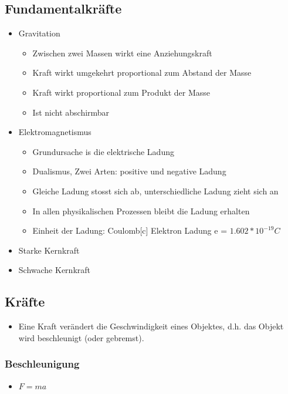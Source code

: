 \documentclass[8pt,a4paper]{scrartcl}
\begin{document}
\begin{multicols*}{3}
    		\subsection{Fundamentalkräfte}
			\begin{itemize}\itemsep0pt				
				\item Gravitation
				\begin{itemize}\itemsep0pt				
					\item Zwischen zwei Massen wirkt eine Anziehungskraft
					\item Kraft wirkt umgekehrt proportional zum Abstand der Masse
					\item Kraft wirkt proportional zum Produkt der Masse
					\item Ist nicht abschirmbar
				\end{itemize}
				\item Elektromagnetismus				
				\begin{itemize}\itemsep0pt				
					\item Grundursache is die elektrische Ladung
					\item Dualismus, Zwei Arten: positive und negative Ladung
					\item Gleiche Ladung stosst sich ab, unterschiedliche Ladung zieht sich an
					\item In allen physikalischen Prozessen bleibt die Ladung erhalten
					\item Einheit der Ladung: Coulomb[c] Elektron Ladung e = $1.602*10^{-19}C$
				\end{itemize}
				\item Starke Kernkraft		
				\item Schwache Kernkraft
			\end{itemize}
			
			\subsection{Kräfte}
				\begin{itemize}\itemsep0pt					
					\item Eine Kraft verändert die Geschwindigkeit eines Objektes, d.h. das Objekt wird beschleunigt (oder gebremst). 
				\end{itemize}
				\subsubsection{Beschleunigung}
					\begin{itemize}\itemsep0pt				
						\item $F=ma$
					\end{itemize}

\end{multicols*}
\end{document}
